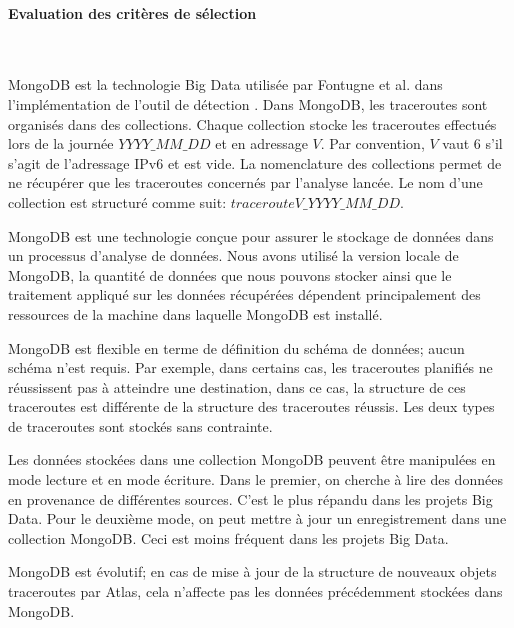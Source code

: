 \paragraph{Evaluation des critères de sélection}~

MongoDB est la technologie Big Data utilisée par  Fontugne et al.  dans l'implémentation de l'outil de détection \cite{InternetHealthReport}. Dans MongoDB, les traceroutes sont organisés  dans des collections.  Chaque collection stocke les traceroutes effectués lors de la journée $YYYY\_MM\_DD$ et en adressage $V$. Par convention,  $V$  vaut $6$ s'il s'agit de l'adressage IPv6 et est vide.  La nomenclature  des collections permet de ne récupérer que les traceroutes concernés par l'analyse lancée. Le nom d'une collection est structuré comme suit: 	$tracerouteV\_YYYY\_MM\_DD$.
 

 
MongoDB est une technologie conçue pour assurer  le stockage de données dans un processus d'analyse de données. Nous avons utilisé la version locale de MongoDB, la quantité de données que nous pouvons stocker ainsi que le traitement appliqué sur les données récupérées dépendent principalement des ressources de la machine dans laquelle MongoDB est installé.
 
MongoDB est flexible en terme de définition du schéma de données; aucun schéma n'est requis.   Par exemple, dans certains cas, les traceroutes planifiés ne réussissent pas à atteindre une destination, dans ce cas, la structure de ces  traceroutes est différente  de la structure des traceroutes réussis. Les deux types de traceroutes sont stockés sans contrainte.

Les données stockées dans une collection MongoDB peuvent être manipulées en mode lecture et en mode écriture. Dans le premier, on cherche à lire des données en provenance de différentes sources. C'est le plus répandu dans les projets Big Data. Pour le deuxième mode, on peut mettre à jour un enregistrement dans une collection MongoDB. Ceci est moins fréquent dans les projets Big Data.

 
 MongoDB est évolutif; en cas de   mise à jour de la structure de nouveaux  objets traceroutes par Atlas,  cela n'affecte pas les données précédemment  stockées  dans MongoDB.
 
